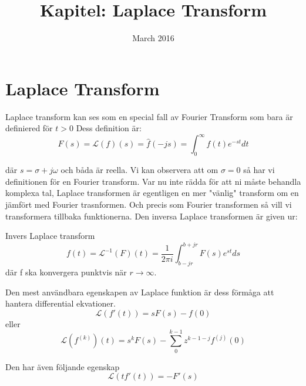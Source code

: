 \documentclass{article}
\title{Kapitel: Laplace Transform}
\author{ }
\date{March 2016}
\begin{document}
\maketitle

\section{Laplace Transform}



Laplace transform kan ses som en special fall av Fourier Transform som bara är definiered för $t>0$
Dess definition är:
$$F(s) = \mathcal{L} (f)(s) = \hat{f}(-js) = \int_{0}^{\infty} f(t)e^{-st} dt $$

där $s = \sigma + j \omega$ och båda är reella. Vi kan observera att om $\sigma = 0$ så har vi definitionen
för en Fourier transform. Var nu inte rädda för att ni måste behandla komplexa tal, Laplace transformen är
egentligen en mer "vänlig" transform om en jämfört med Fourier trasnformen. 
Och precis som Fourier transformen så vill vi transformera tillbaka funktionerna. 
Den inversa Laplace transformen är given ur:

Invers Laplace transform
$$f(t) = \mathcal{L}^{-1} (F)(t) = \frac{1}{2 \pi i} \int_{b-jr}^{b+jr} F(s) e^{st} ds $$
där f ska konvergera punktvis när $r\rightarrow \infty$.

Den mest användbara egenskapen av Laplace funktion är dess förmåga att hantera differential ekvationer.
$$\mathcal{L} (f'(t)) = s F(s) - f(0)$$
eller
$$\mathcal{L} (f^{(k)}) (t) = s^k F(s) - \sum_{0}^{k-1} z^{k-1-j} f^{(j)} (0)$$

Den har även följande egenskap 
$$\mathcal{L} (t f'(t)) = -F'(s) $$
\end{document}
